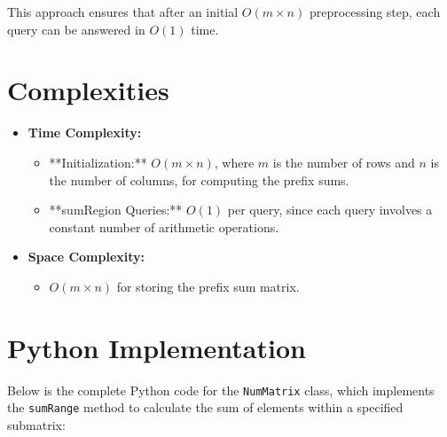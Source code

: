 This approach ensures that after an initial \( O(m \times n) \) preprocessing step, each query can be answered in \( O(1) \) time.


\section*{Complexities}

\begin{itemize}
    \item \textbf{Time Complexity:} 
    \begin{itemize}
        \item **Initialization:** \( O(m \times n) \), where \( m \) is the number of rows and \( n \) is the number of columns, for computing the prefix sums.
        \item **sumRegion Queries:** \( O(1) \) per query, since each query involves a constant number of arithmetic operations.
    \end{itemize}
    
    \item \textbf{Space Complexity:} 
    \begin{itemize}
        \item \( O(m \times n) \) for storing the prefix sum matrix.
    \end{itemize}
\end{itemize}

\newpage
\section*{Python Implementation}


Below is the complete Python code for the \texttt{NumMatrix} class, which implements the \texttt{sumRange} method to calculate the sum of elements within a specified submatrix:

